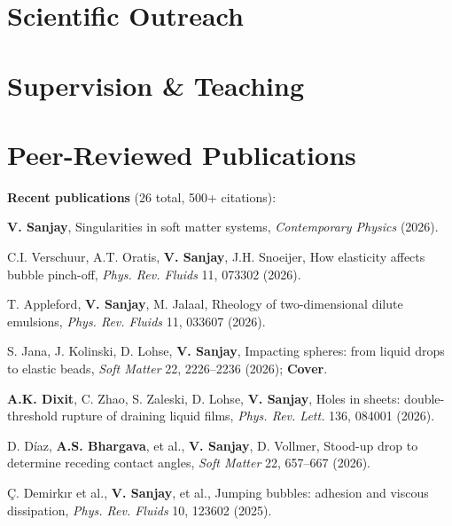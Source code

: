 \documentclass[10pt,a4paper,colorlinks,linkcolor=blue,urlcolor=blue]{moderncv}
\begin{document}
\section{Scientific Outreach}

\section{Supervision \& Teaching}


\section{Peer-Reviewed Publications}

\textbf{Recent publications} (26 total, 500+ citations):
\begin{enumerate}[leftmargin=1.5em,label=\textbf{[\arabic*]}]
\item \textbf{V. Sanjay}, Singularities in soft matter systems, \textit{Contemporary Physics} (2026).
\item C.I. Verschuur, A.T. Oratis, \textbf{V. Sanjay}, J.H. Snoeijer, How elasticity affects bubble pinch-off, \textit{Phys. Rev. Fluids} 11, 073302 (2026).
\item T. Appleford, \textbf{V. Sanjay}, M. Jalaal, Rheology of two-dimensional dilute emulsions, \textit{Phys. Rev. Fluids} 11, 033607 (2026).
\item S. Jana, J. Kolinski, D. Lohse, \textbf{V. Sanjay}, Impacting spheres: from liquid drops to elastic beads, \textit{Soft Matter} 22, 2226--2236 (2026); \textbf{Cover}.
\item \textbf{A.K. Dixit}, C. Zhao, S. Zaleski, D. Lohse, \textbf{V. Sanjay}, Holes in sheets: double-threshold rupture of draining liquid films, \textit{Phys. Rev. Lett.} 136, 084001 (2026).
\item D. Díaz, \textbf{A.S. Bhargava}, et al., \textbf{V. Sanjay}, D. Vollmer, Stood-up drop to determine receding contact angles, \textit{Soft Matter} 22, 657--667 (2026).
\item Ç. Demirkır et al., \textbf{V. Sanjay}, et al., Jumping bubbles: adhesion and viscous dissipation, \textit{Phys. Rev. Fluids} 10, 123602 (2025).
\end{enumerate}
\end{document}
